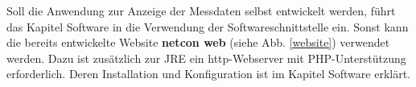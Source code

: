 \documentclass[a4paper,14pt,headsepline]{scrartcl}
\begin{document}
\begin{figure}[h]
\begin{center}
\end{center}
\end{figure}

\newpage
Soll die Anwendung zur Anzeige der Messdaten selbst entwickelt werden, führt das Kapitel Software in die Verwendung der Softwareschnittstelle ein. Sonst kann die bereits entwickelte Website \textbf{netcon web} (siehe Abb. \ref{website}) verwendet werden. Dazu ist zusätzlich zur JRE ein http-Webserver mit PHP-Unterstützung erforderlich. Deren Installation und Konfiguration ist im Kapitel Software erklärt. 

\begin{figure}[h]
\begin{center}
\end{center}
\end{figure}
\end{document}
